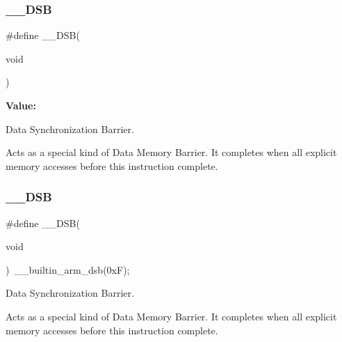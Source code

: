 \subsubsection{\texorpdfstring{\_\_DSB}{\_\_DSB}\hspace{0.1cm}{\footnotesize\ttfamily [1/2]}}
{\footnotesize\ttfamily \#define \+\_\+\+\_\+\+D\+SB(\begin{DoxyParamCaption}\item[{}]{void }\end{DoxyParamCaption})}

{\bfseries Value\+:}
\begin{DoxyCode}{0}
\DoxyCodeLine{\textcolor{keywordflow}{do} \{\(\backslash\)}

\end{DoxyCode}


Data Synchronization Barrier. 

Acts as a special kind of Data Memory Barrier. It completes when all explicit memory accesses before this instruction complete. \mbox{\label{group___c_m_s_i_s___core___instruction_interface_ga067d257a2b34565410acefb5afef2203}} 
\subsubsection{\texorpdfstring{\_\_DSB}{\_\_DSB}\hspace{0.1cm}{\footnotesize\ttfamily [2/2]}}
{\footnotesize\ttfamily \#define \+\_\+\+\_\+\+D\+SB(\begin{DoxyParamCaption}\item[{}]{void }\end{DoxyParamCaption})~\+\_\+\+\_\+builtin\+\_\+arm\+\_\+dsb(0x\+F);}



Data Synchronization Barrier. 

Acts as a special kind of Data Memory Barrier. It completes when all explicit memory accesses before this instruction complete. \mbox{\label{group___c_m_s_i_s___core___instruction_interface_gaad233022e850a009fc6f7602be1182f6}} 

